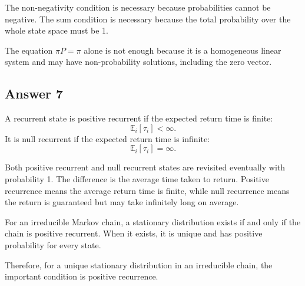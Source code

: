 \documentclass[12pt,a4paper]{article}
\theoremstyle{lecturestyle}
\newcommand{\E}{\mathbb{E}}
\begin{document}
The non-negativity condition is necessary because probabilities cannot be negative. The sum condition is necessary because the total probability over the whole state space must be 1.

The equation $\pi P=\pi$ alone is not enough because it is a homogeneous linear system and may have non-probability solutions, including the zero vector.

\subsection*{Answer 7}

A recurrent state is positive recurrent if the expected return time is finite:
\[
\E_i[\tau_i]<\infty.
\]
It is null recurrent if the expected return time is infinite:
\[
\E_i[\tau_i]=\infty.
\]

Both positive recurrent and null recurrent states are revisited eventually with probability 1. The difference is the average time taken to return. Positive recurrence means the average return time is finite, while null recurrence means the return is guaranteed but may take infinitely long on average.

For an irreducible Markov chain, a stationary distribution exists if and only if the chain is positive recurrent. When it exists, it is unique and has positive probability for every state.

Therefore, for a unique stationary distribution in an irreducible chain, the important condition is positive recurrence.
\end{document}
